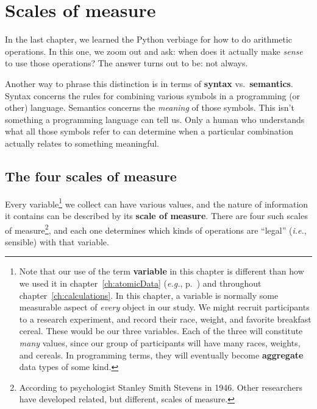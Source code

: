 

\chapter{Scales of measure}
\label{ch:scalesOfMeasure}

In the last chapter, we learned the Python verbiage for how to do arithmetic
operations. In this one, we zoom out and ask: when does it actually make
\textit{sense} to use those operations? The answer turns out to be: not always.

Another way to phrase this distinction is in terms of \textbf{syntax}
vs.~\textbf{semantics}. Syntax concerns the rules for combining various symbols
in a programming (or other) language. Semantics concerns the \textit{meaning}
of those symbols. This isn't something a programming language can tell us. Only
a human who understands what all those symbols refer to can determine when a
particular combination actually relates to something meaningful.

\section{The four scales of measure}

\label{variableDifferent}

Every variable\footnote{Note that our use of the term \textbf{variable} in this
chapter is different than how we used it in chapter~\ref{ch:atomicData}
(\textit{e.g.}, p.~\pageref{sec:envsAndVariables}) and throughout
chapter~\ref{ch:calculations}. In this chapter, a variable is normally some
measurable aspect of \textit{every} object in our study. We might recruit
participants to a research experiment, and record their race, weight, and
favorite breakfast cereal. These would be our three variables. Each of the
three will constitute \textit{many} values, since our group of participants
will have many races, weights, and cereals. In programming terms, they will
eventually become \textbf{aggregate} data types of some kind.} we collect can
have various values, and the nature of information it contains can be described
by its \textbf{scale of measure}. There are four such scales of
measure\footnote{According to psychologist Stanley Smith Stevens in 1946. Other
researchers have developed related, but different, scales of measure.}, and
each one determines which
kinds of operations are ``legal'' (\textit{i.e.}, sensible) with that
variable.

